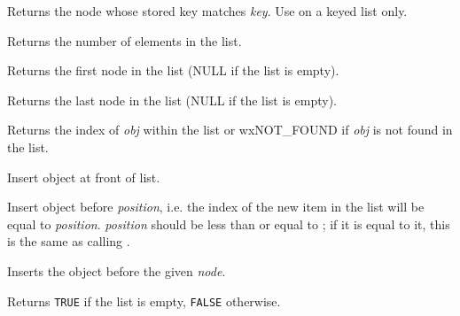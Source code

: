 Returns the node whose stored key matches {\it key}. Use on a keyed list only.

\label{wxlistgetcount}


Returns the number of elements in the list.

\label{wxlistgetfirst}


Returns the first node in the list (NULL if the list is empty).

\label{wxlistgetlast}


Returns the last node in the list (NULL if the list is empty).

\label{wxlistindexof}


Returns the index of {\it obj} within the list or wxNOT\_FOUND if {\it obj} 
is not found in the list.

\label{wxlistinsert}


Insert object at front of list.


Insert object before {\it position}, i.e. the index of the new item in the
list will be equal to {\it position}. {\it position} should be less than or
equal to ; if it is equal to it, this is the
same as calling .


Inserts the object before the given {\it node}.

\label{wxlistisempty}


Returns {\tt TRUE} if the list is empty, {\tt FALSE} otherwise.

\label{wxlistitemfunc}


